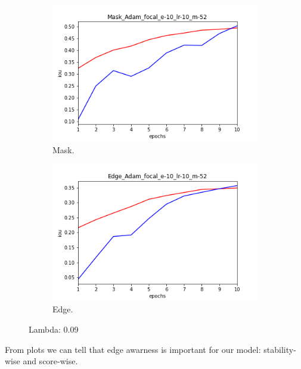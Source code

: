 \documentclass[a4paper]{article}
\begin{document}
\begin{figure}[H]
    \centering
    \begin{subfigure}[b]{0.45\textwidth}
        \includegraphics[width=\textwidth]{imgs/lambda/9/Mask_Adam_focal_e-10_lr-10_m-52_13_May_2022-22:50.png}
        \caption{Mask.}
    \end{subfigure}
    \hfill
    \begin{subfigure}[b]{0.45\textwidth}
        \includegraphics[width=\textwidth]{imgs/lambda/9/Edge_Adam_focal_e-10_lr-10_m-52_13_May_2022-22:50.png}
        \caption{Edge.}
    \end{subfigure}
    \caption{Lambda: 0.09}
\end{figure}
From plots we can tell that edge awarness is important for our model: stability-wise
and score-wise.
\newpage
\end{document}
